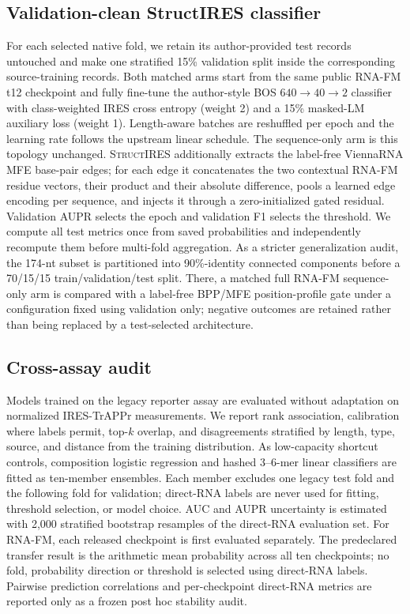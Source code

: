 \subsection{Validation-clean StructIRES classifier}
For each selected native fold, we retain its author-provided test records untouched and make one
stratified 15\% validation split inside the corresponding source-training records. Both matched
arms start from the same public RNA-FM t12 checkpoint and fully fine-tune the author-style
BOS $640\rightarrow40\rightarrow2$ classifier with class-weighted IRES cross entropy (weight 2)
and a 15\% masked-LM auxiliary loss (weight 1). Length-aware batches are reshuffled per epoch and
the learning rate follows the upstream linear schedule. The sequence-only arm is this topology
unchanged. \textsc{StructIRES} additionally extracts the label-free ViennaRNA MFE base-pair edges;
for each edge it concatenates the two contextual RNA-FM residue vectors, their product and their
absolute difference, pools a learned edge encoding per sequence, and injects it through a
zero-initialized gated residual. Validation AUPR selects the epoch and validation F1 selects the
threshold. We compute all test metrics once from saved probabilities and independently recompute
them before multi-fold aggregation. As a stricter generalization audit, the 174-nt subset is
partitioned into 90\%-identity connected components before a 70/15/15 train/validation/test split.
There, a matched full RNA-FM sequence-only arm is compared with a label-free BPP/MFE
position-profile gate under a configuration fixed using validation only; negative outcomes are
retained rather than being replaced by a test-selected architecture.

\subsection{Cross-assay audit}
Models trained on the legacy reporter assay are evaluated without adaptation on normalized
IRES-TrAPPr measurements. We report rank association, calibration where labels permit, top-$k$
overlap, and disagreements stratified by length, type, source, and distance from the training
distribution. As low-capacity shortcut controls, composition logistic regression and hashed
3--6-mer linear classifiers are fitted as ten-member ensembles. Each member excludes one legacy
test fold and the following fold for validation; direct-RNA labels are never used for fitting,
threshold selection, or model choice. AUC and AUPR uncertainty is estimated with 2,000 stratified
bootstrap resamples of the direct-RNA evaluation set.
For RNA-FM, each released checkpoint is first evaluated separately. The predeclared transfer
result is the arithmetic mean probability across all ten checkpoints; no fold, probability
direction or threshold is selected using direct-RNA labels. Pairwise prediction correlations and
per-checkpoint direct-RNA metrics are reported only as a frozen post hoc stability audit.

